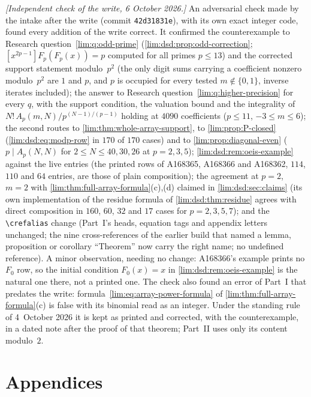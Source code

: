 \documentclass[11pt]{article}
\theoremstyle{definition}
\theoremstyle{remark}
\begin{document}
\emph{[Independent check of the write, 6 October 2026.]} An adversarial
check made by the intake after the write (commit \texttt{42d31831e}), with
its own exact integer code, found every addition of the write correct. It
confirmed the counterexample to Research question~\ref{lim:q:odd-prime}
(\cref{lim:dsd:prop:odd-correction}; $[x^{2p-1}]F_p(F_p(x))=p$ computed for
all primes $p\le13$) and the corrected support statement modulo~$p^2$ (the only
digit sums carrying a coefficient nonzero modulo~$p^2$ are $1$ and $p$, and
$p$ is occupied for every tested $m\notin\{0,1\}$, inverse iterates
included); the answer to Research question~\ref{lim:q:higher-precision} for
every $q$, with the support condition, the valuation bound and the
integrality of $N!\,A_p(m,N)/p^{(N-1)/(p-1)}$ holding at $4090$ coefficients
($p\le11$, $-3\le m\le6$); the second routes to
\cref{lim:thm:whole-array-support}, to \cref{lim:prop:P-closed}
(\eqref{lim:dsd:eq:modp-row} in $170$ of $170$ cases) and to
\cref{lim:prop:diagonal-even} ($p\mid A_p(N,N)$ for $2\le N\le40,30,26$ at
$p=2,3,5$); \cref{lim:dsd:rem:oeis-example} against the live entries (the
printed rows of A168365, A168366 and A168362, $114$, $110$ and $64$
entries, are those of plain composition); the agreement at $p=2$, $m=2$
with \cref{lim:thm:full-array-formula}(c),(d) claimed in
\cref{lim:dsd:sec:claims} (its own implementation of the residue formula of
\cref{lim:dsd:thm:residue} agrees with direct composition in $160$, $60$,
$32$ and $17$ cases for $p=2,3,5,7$); and the \verb|\crefalias| change
(Part~I's heads, equation tags and appendix letters unchanged; the nine
cross-references of the earlier build that named a lemma, proposition or
corollary ``Theorem'' now carry the right name; no undefined reference). A
minor observation, needing no change: A168366's example prints no $F_0$
row, so the initial condition $F_0(x)=x$ in
\cref{lim:dsd:rem:oeis-example} is the natural one there, not a printed
one. The check also found an error of Part~I that predates the write:
formula~\eqref{lim:eq:array-power-formula} of
\cref{lim:thm:full-array-formula}(c) is false with its binomial read as an
integer. Under the standing rule of 4~October 2026 it is kept as printed
and corrected, with the counterexample, in a dated note after the proof of
that theorem; Part~II uses only its content modulo~$2$.

\appendix
{}
{}
\part*{Appendices}
\end{document}
